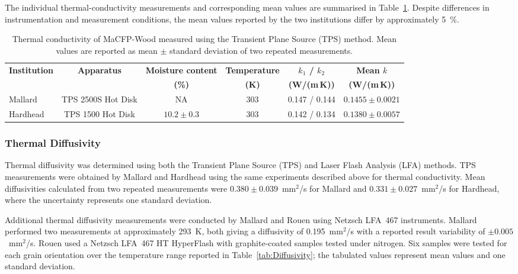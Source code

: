 \documentclass{book}
\begin{document}
The individual thermal-conductivity measurements and corresponding mean values are summarised in Table~\ref{tab:TPS_conductivity}. Despite differences in instrumentation and measurement conditions, the mean values reported by the two institutions differ by approximately 5~\%.

\begin{table}[h]
\centering
\caption{Thermal conductivity of MaCFP-Wood measured using the Transient Plane Source (TPS) method. Mean values are reported as mean $\pm$ standard deviation of two repeated measurements.}
\label{tab:TPS_conductivity}
\begin{tabular}{lccccc}
\hline
\textbf{Institution} & \textbf{Apparatus} & \textbf{Moisture content} & \textbf{Temperature} & \textbf{$k_1$ / $k_2$} & \textbf{Mean $k$} \\
& & \textbf{(\%)} & \textbf{(K)} & \textbf{(W/(m\,K))} & \textbf{(W/(m\,K))} \\
\hline
Mallard & TPS 2500S Hot Disk & NA & 303 & 0.147 / 0.144 & $0.1455 \pm 0.0021$ \\
Hardhead & TPS 1500 Hot Disk & $10.2 \pm 0.3$ & 303 & 0.142 / 0.134 & $0.1380 \pm 0.0057$ \\
\hline
\end{tabular}
\end{table}

\subsubsection{Thermal Diffusivity}

Thermal diffusivity was determined using both the Transient Plane Source (TPS) and Laser Flash Analysis (LFA) methods. TPS measurements were obtained by Mallard and Hardhead using the same experiments described above for thermal conductivity. Mean diffusivities calculated from two repeated measurements were $0.380 \pm 0.039$~mm$^2$/s for Mallard and $0.331 \pm 0.027$~mm$^2$/s for Hardhead, where the uncertainty represents one standard deviation.

Additional thermal diffusivity measurements were conducted by Mallard and Rouen using Netzsch LFA~467 instruments. Mallard performed two measurements at approximately 293~K, both giving a diffusivity of 0.195~mm$^2$/s with a reported result variability of $\pm 0.005$~mm$^2$/s. Rouen used a Netzsch LFA~467 HT HyperFlash with graphite-coated samples tested under nitrogen. Six samples were tested for each grain orientation over the temperature range reported in Table~\ref{tab:Diffusivity}; the tabulated values represent mean values and one standard deviation.
\end{document}

